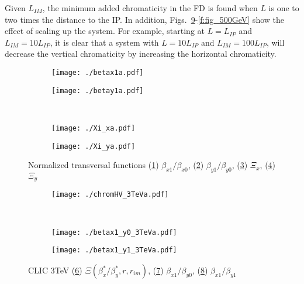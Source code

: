 Given $L_{IM}$, the minimum added chromaticity in the FD is found when $L$ is one to two times the distance to the IP. In addition, Figs.~\ref{f:fig_3TeV}-\ref{f:fig_500GeV} show the effect of scaling up the system. For example, starting at $L=L_{IP}$ and $L_{IM}=10L_{IP}$, it is clear that a system with $L=10L_{IP}$ and $L_{IM}=100L_{IP}$, will decrease the vertical chromaticity by increasing the horizontal chromaticity.
\begin{figure}
\begin{subfigure}{0.5\textwidth}
 \texttt{[image: ./betax1a.pdf]}\caption{}\label{figT:Bx}
 \end{subfigure}
 \begin{subfigure}{0.5\textwidth}
 \texttt{[image: ./betay1a.pdf]}\caption{}\label{figT:By}
 \end{subfigure}\\
 \begin{subfigure}{0.5\textwidth}
 \texttt{[image: ./Xi\_xa.pdf]}\caption{}\label{figT:xix}
 \end{subfigure}
 \begin{subfigure}{0.5\textwidth}
 \texttt{[image: ./Xi\_ya.pdf]}\caption{}\label{figT:xiy}
 \end{subfigure}
 \caption{Normalized transversal functions (\ref{figT:Bx}) $\beta_{x1}/\beta_{x0}$, (\ref{figT:By}) $\beta_{y1}/\beta_{y0}$, (\ref{figT:xix}) $\Xi_x$, (\ref{figT:xiy}) $\Xi_y$}\label{f:figT}
\end{figure}
\begin{figure}
\begin{subfigure}{1.0\textwidth}
 \texttt{[image: ./chromHV\_3TeVa.pdf]}\caption{}\label{fig_3TeV:chrom}
 \end{subfigure}\\
 \begin{subfigure}{0.5\textwidth}
 \texttt{[image: ./betax1\_y0\_3TeVa.pdf]}\caption{}\label{fig_3TeV:bx1_y0}
 \end{subfigure}
  \begin{subfigure}{0.5\textwidth}
 \texttt{[image: ./betax1\_y1\_3TeVa.pdf]}\caption{}\label{fig_3TeV:bx1_y1}
 \end{subfigure}
 \caption{CLIC 3TeV (\ref{fig_3TeV:chrom}) $\Xi(\beta^*_x/\beta^*_y,r,r_{im})$, (\ref{fig_3TeV:bx1_y0}) $\beta_{x1}/\beta_{y0}$, (\ref{fig_3TeV:bx1_y1}) $\beta_{x1}/\beta_{y1}$}\label{f:fig_3TeV}
\end{figure}
